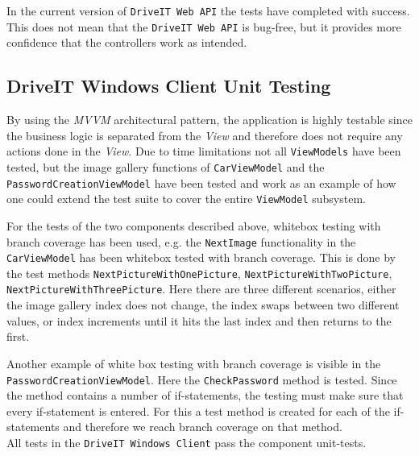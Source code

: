 In the current version of \texttt{DriveIT Web API} the tests have completed with success. This does not mean that the \texttt{DriveIT Web API} is bug-free, but it provides more confidence that the controllers work as intended.

\subsection{DriveIT Windows Client Unit Testing}
By using the \textit{MVVM} architectural pattern, the application is highly testable since the business logic is separated from the \textit{View} and therefore does not require any actions done in the \textit{View}. Due to time limitations not all \texttt{ViewModels} have been tested, but the image gallery functions of \texttt{CarViewModel} and the \texttt{PasswordCreationViewModel} have been tested and work as an example of how one could extend the test suite to cover the entire \texttt{ViewModel} subsystem.

For the tests of the two components described above, whitebox testing with branch coverage has been used, e.g. the \texttt{NextImage} functionality in the \texttt{CarViewModel} has been whitebox tested with branch coverage. This is done by the test methods \texttt{NextPictureWithOnePicture}, \texttt{NextPictureWithTwoPicture}, \texttt{NextPictureWithThreePicture}. Here there are three different scenarios, either the image gallery index does not change, the index swaps between two different values, or index increments until it hits the last index and then returns to the first. 

Another example of white box testing with branch coverage is visible in the \texttt{PasswordCreationViewModel}. Here the \texttt{CheckPassword} method is tested. Since the method contains a number of if-statements, the testing must make sure that every if-statement is entered. For this a test method is created for each of the if-statements and therefore we reach branch coverage on that method.\\

All tests in the \texttt{DriveIT Windows Client} pass the component unit-tests.
